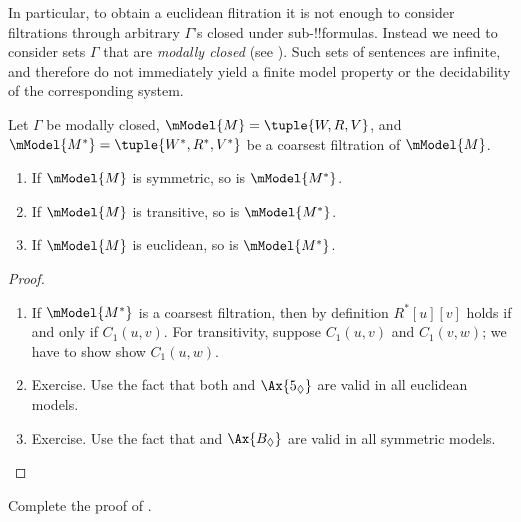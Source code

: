 \documentclass[../../../include/open-logic-section]{subfiles}
\begin{document}
In particular, to obtain a euclidean flitration it is not enough to
consider filtrations through arbitrary $\Gamma$'s closed under
sub-!!{formula}s. Instead we need to consider sets $\Gamma$ that are
\emph{modally closed} (see ). Such sets
of sentences are infinite, and therefore do not immediately yield a
finite model property or the decidability of the corresponding system.

\begin{thm}
  Let $\Gamma$ be modally closed, $\mModel{M}=\tuple{W,R,V}$, and
  $\mModel{M^*} = \tuple{W^*,R^*,V^*}$ be a coarsest filtration of
  $\mModel{M}$.
  \begin{enumerate}
  \item If $\mModel{M}$ is symmetric, so is $\mModel{M^*}$.
  \item If $\mModel{M}$ is transitive, so is $\mModel{M^*}$.
  \item If $\mModel{M}$ is euclidean, so is $\mModel{M^*}$.
  \end{enumerate}
\end{thm}

\begin{proof}
\begin{enumerate}
  \item If $\mModel{M^*}$ is a coarsest filtration, then by definition
    $R^*[u][v]$ holds if and only if $C_1(u,v)$. For transitivity,
    suppose $C_1(u,v)$ and $C_1(v,w)$; we have to show show
    $C_1(u,w)$. 
  \item Exercise. Use the fact that both  and $\Ax{5_\Diamond}$
    are valid in all euclidean models.
  \item Exercise. Use the fact that  and $\Ax{B_\Diamond}$ are
    valid in all symmetric models.
\end{enumerate}
\end{proof}

\begin{prob}
  Complete the proof of .
\end{prob}
\end{document}
